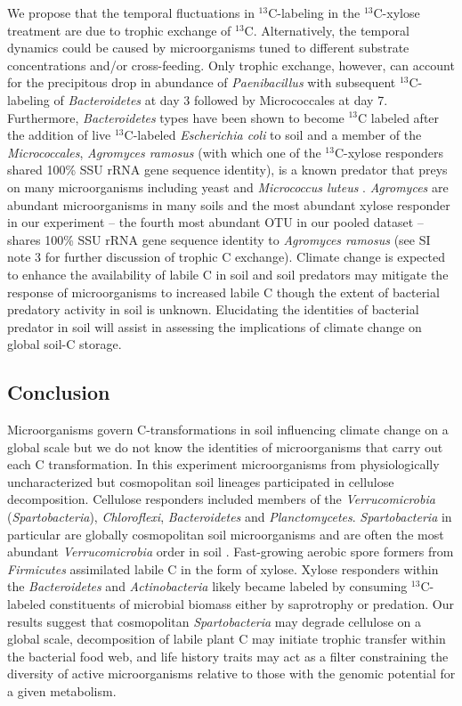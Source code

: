 We propose that the temporal fluctuations in $^{13}$C-labeling in the
$^{13}$C-xylose treatment are due to trophic exchange of $^{13}$C.
Alternatively, the temporal dynamics could be caused by microorganisms tuned to
different substrate concentrations and/or cross-feeding. Only trophic exchange,
however, can account for the precipitous drop in abundance of
\textit{Paenibacillus} with subsequent $^{13}$C-labeling of
\textit{Bacteroidetes} at day 3 followed by Micrococcales at day 7.
Furthermore, \textit{Bacteroidetes} types have been shown to become $^{13}$C
labeled after the addition of live $^{13}$C-labeled \textit{Escherichia coli}
to soil \citep{Lueders2006} and a member of the \textit{Micrococcales},
\textit{Agromyces ramosus} (with which one of the $^{13}$C-xylose responders
shared 100\% SSU rRNA gene sequence identity), is a known predator that preys
on many microorganisms including yeast and \textit{Micrococcus luteus}
\citep{16346402}.  \textit{Agromyces} are abundant microorganisms in many soils
and the most abundant xylose responder in our experiment -- the fourth most
abundant OTU in our pooled dataset -- shares 100\% SSU rRNA gene sequence
identity to \textit{Agromyces ramosus} (see SI note 3 for further discussion of
trophic C exchange). Climate change is expected to enhance the availability of
labile C in soil and soil predators may mitigate the response of microorganisms
to increased labile C \citep{Crowther2015} though the extent of bacterial
predatory activity in soil is unknown. Elucidating the identities of bacterial
predator in soil will assist in assessing the implications of climate change on
global soil-C storage.

\subsection{Conclusion} 
Microorganisms govern C-transformations in soil influencing climate change on
a global scale but we do not know the identities of microorganisms that carry
out each C transformation. In this experiment microorganisms from physiologically
uncharacterized but cosmopolitan soil lineages participated in cellulose
decomposition. Cellulose responders included members of the
\textit{Verrucomicrobia} (\textit{Spartobacteria}), \textit{Chloroflexi},
\textit{Bacteroidetes} and \textit{Planctomycetes}. \textit{Spartobacteria} in
particular are globally cosmopolitan soil microorganisms and are often the most
abundant \textit{Verrucomicrobia} order in soil \citep{Bergmann_2011}.
Fast-growing aerobic spore formers from \textit{Firmicutes} assimilated labile
C in the form of xylose. Xylose responders within the \textit{Bacteroidetes}
and \textit{Actinobacteria} likely became labeled by consuming $^{13}$C-labeled
constituents of microbial biomass either by saprotrophy or predation. Our
results suggest that cosmopolitan \textit{Spartobacteria} may degrade cellulose
on a global scale, decomposition of labile plant C may initiate trophic transfer 
within the bacterial food web, and life history traits may act
as a filter constraining the diversity of active microorganisms relative to
those with the genomic potential for a given metabolism.
